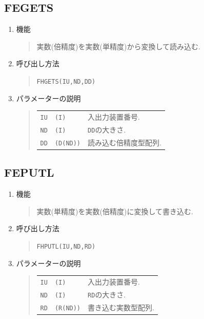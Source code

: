 \subsection{FEGETS}
\begin{enumerate}
  \item 機能 
  \begin{quote}
   実数(倍精度)を実数(単精度)から変換して読み込む.
  \end{quote}
  \item 呼び出し方法 
  \begin{quote}
    {\tt FHGETS(IU,ND,DD)}
  \end{quote}
  \item パラメーターの説明 
  \begin{quote}
    \begin{tabular}{llp{10cm}}
      {\tt IU}   & {\tt (I)} & 入出力装置番号. \\
      {\tt ND}   & {\tt (I)} & {\tt DD}の大きさ.\\
      {\tt DD}   & {\tt (D(ND))} & 読み込む倍精度型配列.
    \end{tabular}
  \end{quote}
\end{enumerate}

\subsection{FEPUTL}
\begin{enumerate}
  \item 機能
  \begin{quote}
   実数(単精度)を実数(倍精度)に変換して書き込む.
  \end{quote}
  \item 呼び出し方法 
  \begin{quote}
    {\tt FHPUTL(IU,ND,RD)}
  \end{quote}
  \item パラメーターの説明 
  \begin{quote}
    \begin{tabular}{llp{10cm}}
      {\tt IU}   & {\tt (I)} & 入出力装置番号. \\
      {\tt ND}   & {\tt (I)} & {\tt RD}の大きさ.\\
      {\tt RD}   & {\tt (R(ND))} & 書き込む実数型配列.
    \end{tabular}
  \end{quote}
\end{enumerate}


